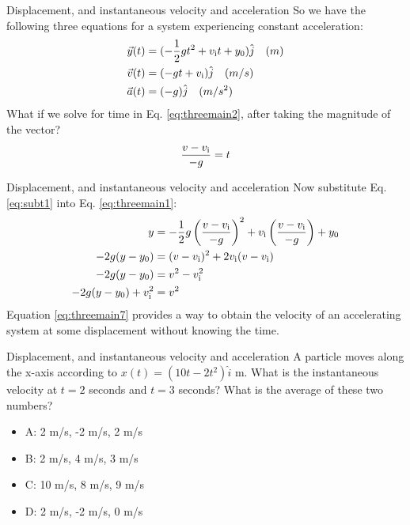 \documentclass{beamer}
\begin{document}
\begin{frame}{Displacement, and instantaneous velocity and acceleration}
So we have the following three equations for a system experiencing constant acceleration:
\begin{align}
\vec{y}(t) &= (-\frac{1}{2}gt^2+v_{\rm i}t+y_{\rm 0}) \hat{j} \quad (m) \label{eq:threemain1} \\
\vec{v}(t) &= (-gt + v_{\rm i}) \hat{j} \quad (m/s) \label{eq:threemain2} \\
\vec{a}(t) &= (-g) \hat{j} \quad (m/s^2) \label{eq:threemain3}
\end{align}
What if we solve for time in Eq. \ref{eq:threemain2}, after taking the magnitude of the vector? \\
\begin{equation}
\frac{v-v_{\rm i}}{-g} = t
\label{eq:subt1}
\end{equation}
\end{frame}

\begin{frame}{Displacement, and instantaneous velocity and acceleration}
Now substitute Eq. \ref{eq:subt1} into Eq. \ref{eq:threemain1}:\\
\begin{align}
y &= -\frac{1}{2}g\left(\frac{v-v_{\rm i}}{-g}\right)^2+v_{\rm i}\left(\frac{v-v_{\rm i}}{-g}\right)+y_{\rm 0} \label{eq:threemain4} \\ 
-2g(y-y_{\rm 0}) &= (v-v_{\rm i})^2 + 2v_{\rm i}(v-v_{\rm i}) \label{eq:threemain5} \\
-2g(y-y_{\rm 0}) &= v^2-v_{\rm i}^2 \label{eq:threemain6} \\
-2g(y-y_{\rm 0})+v_{\rm i}^2 &= v^2 \label{eq:threemain7}
\end{align}
Equation \ref{eq:threemain7} provides a way to obtain the velocity of an accelerating system at some displacement without knowing the time.
\end{frame}

\begin{frame}{Displacement, and instantaneous velocity and acceleration}
A particle moves along the x-axis according to $x(t) = (10t-2t^2)\hat{i}$ m.  What is the instantaneous velocity
at $t=2$ seconds and $t=3$ seconds? What is the average of these two numbers?
\begin{itemize}
\item A: 2 m/s, -2 m/s, 2 m/s
\item B: 2 m/s, 4 m/s, 3 m/s
\item C: 10 m/s, 8 m/s, 9 m/s
\item D: 2 m/s, -2 m/s, 0 m/s
\end{itemize}
\end{frame}
\end{document}
